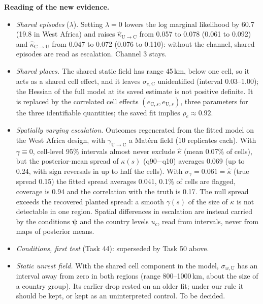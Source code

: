 \documentclass[10pt]{article}
\newcommand{\C}{\mathrm{C}}
\newcommand{\U}{\mathrm{U}}
\begin{document}
\textbf{Reading of the new evidence.}
\begin{itemize}
\item \emph{Shared episodes} ($\lambda$). Setting $\lambda = 0$ lowers the log marginal likelihood by 60.7 (19.8 in West
Africa) and raises $\hat\kappa_{\U\to\C}$ from 0.057 to 0.078 (0.061 to 0.092) and $\hat\kappa_{\C\to\U}$ from 0.047 to
0.072 (0.076 to 0.110): without the channel, shared episodes are read as escalation. Channel 3 stays.
\item \emph{Shared places.} The shared static field has range 45\,km, below one cell, so it acts as a shared cell effect,
and it leaves $\sigma_{e,\C}$ unidentified (interval 0.03--1.00); the Hessian of the full model at its saved estimate is not
positive definite. It is replaced by the correlated cell effects $(e_{\C,s}, e_{\U,s})$, three parameters for the three
identifiable quantities; the saved fit implies $\rho_e \approx 0.92$.
\item \emph{Spatially varying escalation.} Outcomes regenerated from the fitted model on the West Africa design, with
$\gamma_{\U\to\C}$ a Mat\'ern field (10 replicates each). With $\gamma \equiv 0$, cell-level 95\% intervals almost never
exclude $\hat\kappa$ (mean 0.07\% of cells), but the posterior-mean spread of $\kappa(s)$ (q90$-$q10) averages 0.069 (up to
0.24, with sign reversals in up to half the cells). With $\sigma_\gamma = 0.061 = \hat\kappa$ (true spread 0.15) the fitted
spread averages 0.041, 0.1\% of cells are flagged, coverage is 0.94 and the correlation with the truth is 0.17. The null spread
exceeds the recovered planted spread: a smooth $\gamma(s)$ of the size of $\kappa$ is not detectable in one region. Spatial
differences in escalation are instead carried by the conditions $\bm\psi$ and the country levels $u_c$, read from
intervals, never from maps of posterior means.
\item \emph{Conditions, first test} (Task 44): superseded by Task 50 above.
\item \emph{Static unrest field.} With the shared cell component in the model, $\sigma_{w,\U}$ has an interval away from zero
in both regions (range 800--1000\,km, about the size of a country group). Its earlier drop rested on an older fit; under our
rule it should be kept, or kept as an uninterpreted control. To be decided.
\end{itemize}
\end{document}
